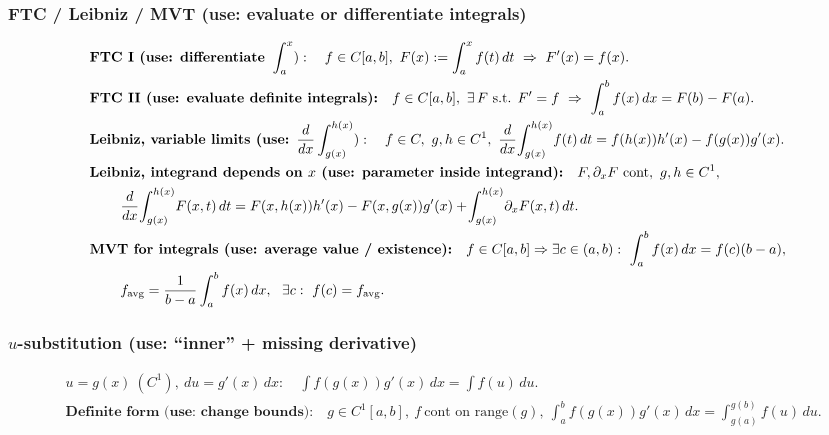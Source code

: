 \documentclass[12pt]{article}
\begin{document}
\subsubsection{FTC / Leibniz / MVT (use: evaluate or differentiate integrals)}
\begin{align*}
&\textbf{FTC I (use: differentiate }\int_a^x):\quad
f\in C[a,b],\ F(x):=\int_a^x f(t)\,dt\ \Rightarrow\ F'(x)=f(x).\\
&\textbf{FTC II (use: evaluate definite integrals):}\quad
f\in C[a,b],\ \exists\,F\ \text{s.t. }F'=f\ \Rightarrow\ \int_a^b f(x)\,dx=F(b)-F(a).\\
&\textbf{Leibniz, variable limits (use: }\frac{d}{dx}\int_{g(x)}^{h(x)}):\quad
f\in C,\ g,h\in C^1,\ \frac{d}{dx}\!\int_{g(x)}^{h(x)}\! f(t)\,dt=f(h(x))h'(x)-f(g(x))g'(x).\\
&\textbf{Leibniz, integrand depends on }x\textbf{ (use: parameter inside integrand):}\quad
F,\partial_xF\ \text{cont},\ g,h\in C^1,\\
&\hspace{2.2em}\frac{d}{dx}\!\int_{g(x)}^{h(x)}\! F(x,t)\,dt
=F(x,h(x))h'(x)-F(x,g(x))g'(x)+\!\int_{g(x)}^{h(x)}\!\partial_xF(x,t)\,dt.\\
&\textbf{MVT for integrals (use: average value / existence):}\quad
f\in C[a,b]\Rightarrow \exists c\in(a,b):\ \int_a^b f(x)\,dx=f(c)(b-a),\\
&\hspace{2.2em}f_{\text{avg}}=\frac{1}{b-a}\int_a^b f(x)\,dx,\ \ \exists c:\ f(c)=f_{\text{avg}}.
\end{align*}

\subsubsection{$u$-substitution (use: ``inner'' + missing derivative)}
\begin{align*}
&u=g(x)\ (C^1),\ du=g'(x)\,dx:\quad \int f(g(x))g'(x)\,dx=\int f(u)\,du.\\
&\textbf{Definite form (use: change bounds):}\quad
g\in C^1[a,b],\ f\ \text{cont on range}(g),\ 
\int_a^b f(g(x))g'(x)\,dx=\int_{g(a)}^{g(b)} f(u)\,du.
\end{align*}
\end{document}
